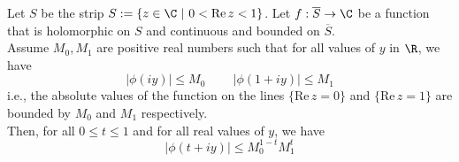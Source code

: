 \begin{lemma}
    \label{lem:threelines}
    \leanok
    Let $S$ be the strip $S:=\{z \in \C \ | \ 0 < \mathrm{Re} \, z < 1 \}$. Let $f: \overline{S} \to \C$
    be a function that is holomorphic on $S$ and continuous and bounded on $\overline{S}$.\\
    Assume $M_0, M_1$ are positive real numbers such that for all values of $y$ in $\R$, we have
    \[| \phi(iy) | \leq M_0 \ \qquad | \phi(1+iy) | \leq M_1 \]
    i.e., the absolute values of the function on the lines $\{\mathrm{Re} \, z = 0\}$ and $\{\mathrm{Re} \, z = 1\}$ are bounded by $M_0$ and $M_1$ respectively.\\
    Then, for all $0 \leq t \leq 1$ and for all real values of $y$, we have
    \[  | \phi(t + iy) | \leq M_0^{1-t} M_1^t\]
\end{lemma}
